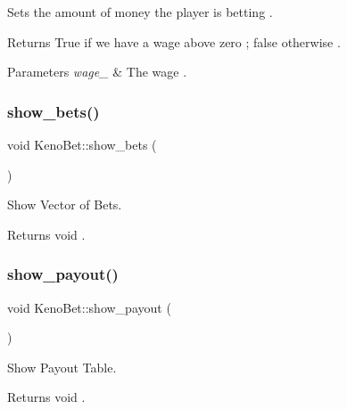 Sets the amount of money the player is betting . 

\begin{DoxyReturn}{Returns}
True if we have a wage above zero ; false otherwise . 
\end{DoxyReturn}

\begin{DoxyParams}{Parameters}
{\em wage\+\_\+} & The wage . \\
\hline
\end{DoxyParams}
\mbox{\label{class_keno_bet_a865301e99ebddfcee895d19eadb43fba}} 
\subsubsection{\texorpdfstring{show\+\_\+bets()}{show\_bets()}}
{\footnotesize\ttfamily void Keno\+Bet\+::show\+\_\+bets (\begin{DoxyParamCaption}{ }\end{DoxyParamCaption})}



Show Vector of Bets. 

\begin{DoxyReturn}{Returns}
void . 
\end{DoxyReturn}
\mbox{\label{class_keno_bet_a50b9ffd882ae67857ecce259f5411f1c}} 
\subsubsection{\texorpdfstring{show\+\_\+payout()}{show\_payout()}}
{\footnotesize\ttfamily void Keno\+Bet\+::show\+\_\+payout (\begin{DoxyParamCaption}{ }\end{DoxyParamCaption})}



Show Payout Table. 

\begin{DoxyReturn}{Returns}
void . 
\end{DoxyReturn}
\mbox{\label{class_keno_bet_aa6f65b35514270c2707e60b9dea23ae9}} 
